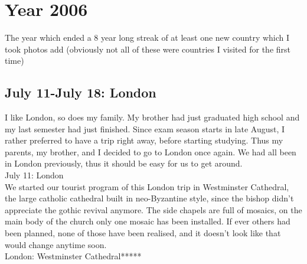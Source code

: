 \chapter{Year 2006}
\label{2006}

The year which ended a 8 year long streak of at least one new country which I took photos add (obviously not all of these were countries I visited for the first time)

\section{July 11-July 18: London}
\label{2006:London}

I like London, so does my family. My brother had just graduated high school and my last semester had just finished. Since exam season starts in late August, I rather preferred to have a trip right away, before starting studying. Thus my parents, my brother, and I decided to go to London once again. We had all been in London previously, thus it should be easy for us to get around.\\

July 11: London\\
We started our tourist program of this London trip in Westminster Cathedral, the large catholic cathedral built in neo-Byzantine style, since the bishop didn't appreciate the gothic revival anymore. The side chapels are full of mosaics, on the main body of the church only one mosaic has been installed. If ever others had been planned, none of those have been realised, and it doesn't look like that would change anytime soon.\\

London: Westminster Cathedral*****\\

